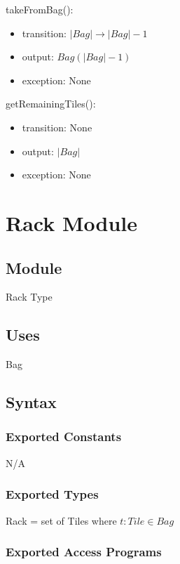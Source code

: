 \documentclass[12pt]{article}
\begin{document}
\noindent takeFromBag():
\begin{itemize}
\item transition: $|Bag| \rightarrow |Bag|-1$
\item output: $Bag(|Bag|-1)$
\item exception: None
\end{itemize}

\noindent getRemainingTiles():
\begin{itemize}
\item transition: None
\item output: $|Bag|$
\item exception: None
\end{itemize}

\newpage

\section* {Rack Module}

\subsection*{Module}

Rack Type

\subsection* {Uses}

Bag

\subsection* {Syntax}

\subsubsection* {Exported Constants}
N/A
\subsubsection* {Exported Types}

Rack = set of Tiles where $t : Tile \in Bag$

\subsubsection* {Exported Access Programs}
\end{document}
